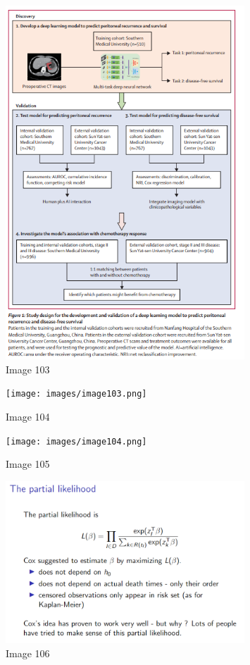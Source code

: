 \documentclass{article}%
\begin{document}
\begin{figure}[h!]%
\centering%
\includegraphics[width=0.8\textwidth]{images/image102.png}%
\caption{Image 103}%
\end{figure}

%


\begin{figure}[h!]%
\centering%
\texttt{[image: images/image103.png]}%
\caption{Image 104}%
\end{figure}

%


\begin{figure}[h!]%
\centering%
\texttt{[image: images/image104.png]}%
\caption{Image 105}%
\end{figure}

%


\begin{figure}[h!]%
\centering%
\includegraphics[width=0.8\textwidth]{images/image105.png}%
\caption{Image 106}%
\end{figure}
\end{document}
